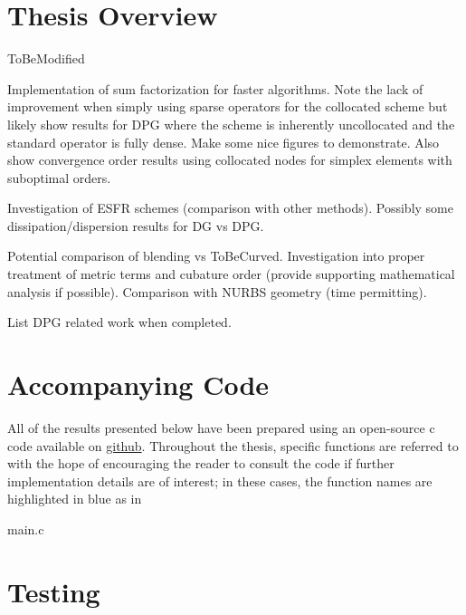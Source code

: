 \documentclass[12pt,Bold,letterpaper,TexShade]{mcgilletdclass}
\numberwithin{equation}{section}
\DeclareRobustCommand{\highlightbox}[2][gray!20]{%
\begin{tcolorbox}[   %
        breakable,
        left=0pt,
        right=0pt,
        top=0pt,
        bottom=0pt,
        colback=#1,
        colframe=#1,
        width=\dimexpr\textwidth\relax, 
        enlarge left by=0mm,
        boxsep=5pt,
        arc=0pt,outer arc=0pt,
        ]
        #2
\end{tcolorbox}
}
\begin{document}
\section{Thesis Overview}
{\color{red} ToBeModified}

Implementation of sum factorization for faster algorithms. Note the lack of improvement when simply using sparse operators for the collocated scheme but likely show results for DPG where the scheme is inherently uncollocated and the standard operator is fully dense. Make some nice figures to demonstrate. Also show convergence order results using collocated nodes for simplex elements with suboptimal orders.

Investigation of ESFR schemes (comparison with other methods). Possibly some dissipation/dispersion results for DG vs DPG.

Potential comparison of blending vs ToBeCurved. Investigation into proper treatment of metric terms and cubature order (provide supporting mathematical analysis if possible). Comparison with NURBS geometry (time permitting).

{\color{red} List DPG related work when completed.}

\section{Accompanying Code}

All of the results presented below have been prepared using an open-source c code available on \href{https://github.com/PhilipZwanenburg/DPGSolver}{{\color{blue} github}}. Throughout the thesis, specific functions are referred to with the hope of encouraging the reader to consult the code if further implementation details are of interest; in these cases, the function names are highlighted in blue as in

\highlightbox[blue!20]{main.c}



\section{Testing}
\label{sec:NumericalResults}
\end{document}
